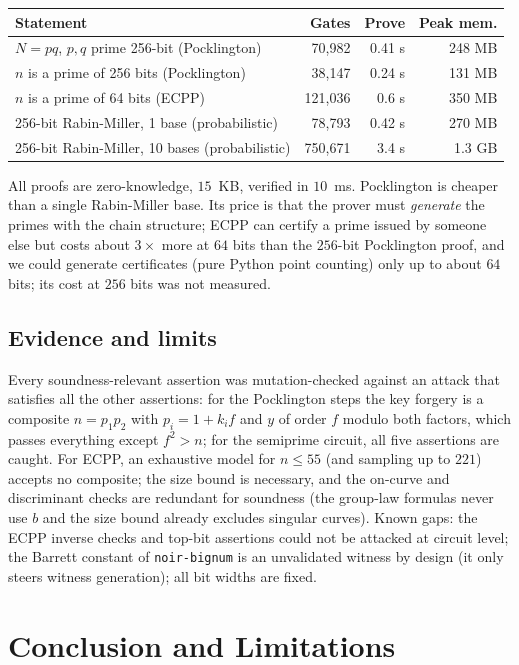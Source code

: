 \documentclass[12pt]{article}
\begin{document}
\begin{center}
\begin{tabular}{lrrr}
\hline
Statement & Gates & Prove & Peak mem. \\
\hline
$N = pq$, $p,q$ prime 256-bit (Pocklington) & 70{,}982 & 0.41 s & 248 MB \\
$n$ is a prime of 256 bits (Pocklington) & 38{,}147 & 0.24 s & 131 MB \\
$n$ is a prime of 64 bits (ECPP) & 121{,}036 & 0.6 s & 350 MB \\
256-bit Rabin-Miller, 1 base (probabilistic) & 78{,}793 & 0.42 s & 270 MB \\
256-bit Rabin-Miller, 10 bases (probabilistic) & 750{,}671 & 3.4 s & 1.3 GB \\
\hline
\end{tabular}
\end{center}
All proofs are zero-knowledge, $15$~KB, verified in $10$~ms. Pocklington is cheaper than a single Rabin-Miller base. Its price is that the prover must \emph{generate} the primes with the chain structure; ECPP can certify a prime issued by someone else but costs about $3\times$ more at $64$ bits than the $256$-bit Pocklington proof, and we could generate certificates (pure Python point counting) only up to about $64$ bits; its cost at $256$ bits was not measured.

\subsection*{Evidence and limits}

Every soundness-relevant assertion was mutation-checked against an attack that satisfies all the other assertions: for the Pocklington steps the key forgery is a composite $n = p_1p_2$ with $p_i = 1 + k_i f$ and $y$ of order $f$ modulo both factors, which passes everything except $f^2>n$; for the semiprime circuit, all five assertions are caught. For ECPP, an exhaustive model for $n \le 55$ (and sampling up to $221$) accepts no composite; the size bound is necessary, and the on-curve and discriminant checks are redundant for soundness (the group-law formulas never use $b$ and the size bound already excludes singular curves). Known gaps: the ECPP inverse checks and top-bit assertions could not be attacked at circuit level; the Barrett constant of \texttt{noir-bignum} is an unvalidated witness by design (it only steers witness generation); all bit widths are fixed.

\section{Conclusion and Limitations}
\end{document}
